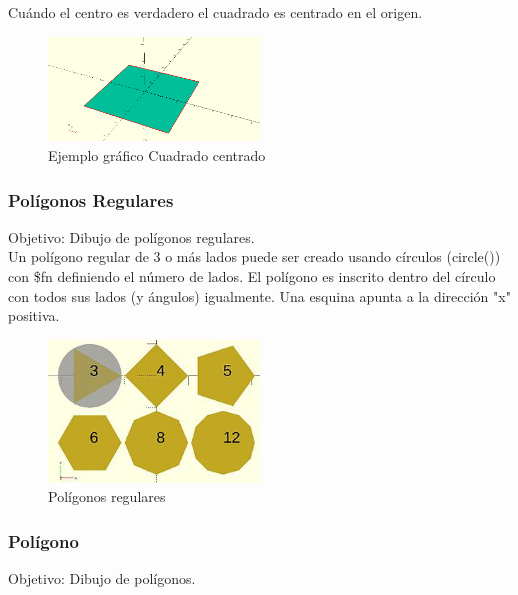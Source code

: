\documentclass{article}
\begin{document}
Cuándo el centro es verdadero el cuadrado es centrado en el origen. 

\begin{figure}[h!]
    \centering
    \includegraphics[width=0.5\textwidth]{Imagenes/CuadradoCentro.png}
    \caption{Ejemplo gráfico Cuadrado centrado}
    \label{fig:grafCuadradoCentro}
\end{figure}



\subsubsection{Polígonos Regulares}

Objetivo: Dibujo de polígonos regulares.\citep{OpenSCS}\\

Un polígono regular de 3 o más lados puede ser creado usando círculos (circle()) con \$fn definiendo el número de lados. El polígono es inscrito dentro del círculo con todos sus lados (y ángulos) igualmente. Una esquina apunta a la dirección "x" positiva.\citep{WikiOpensCAD}

\begin{figure}[h!]
    \centering
    \includegraphics[width=0.5\textwidth]{Imagenes/polygon.jpg}
    \caption{Polígonos regulares}
    \label{fig:grafPolygon}
\end{figure}

\subsubsection{Polígono}

Objetivo: Dibujo de polígonos.\citep{OpenSCS}\\
\end{document}
